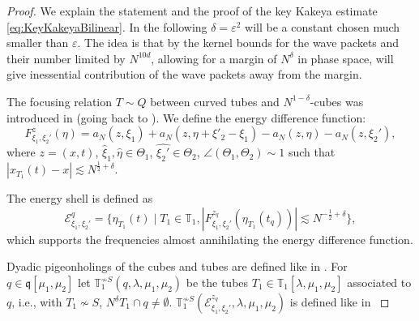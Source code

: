 \documentclass{amsart}
\numberwithin{equation}{section}
\theoremstyle{definition}
\begin{document}
\begin{proof}
We explain the statement and the proof of the key Kakeya estimate \eqref{eq:KeyKakeyaBilinear}. In the following $\delta=\varepsilon^2$ will be a constant chosen much smaller than $\varepsilon$. The idea is that by the kernel bounds for the wave packets and their number limited by $N^{10d}$, allowing for a margin of $N^{\delta}$ in phase space, will give inessential contribution of the wave packets away from the margin.

The focusing relation $T \sim Q$ between curved tubes and $N^{1-\delta}$-cubes was introduced in \cite{SchippaTataru2025} (going back to \cite{Wolff2001,Tao2003}). We define the energy difference function:
\begin{equation*}
F^z_{\xi_1,\xi_2'}(\eta) = a_N(z,\xi_1) + a_N(z,\eta + \xi'_2 - \xi_1) - a_N(z,\eta) - a_N(z,\xi_2'),
\end{equation*}
where $z=(x,t)$, $\hat{\xi}_1,\hat{\eta} \in \Theta_1$, $ \hat{\xi_2'} \in \Theta_2$, $\angle(\Theta_1,\Theta_2) \sim 1$ such that $|x_{T_1}(t) - x| \lesssim N^{\frac{1}{2}+\delta}$.

The energy shell is defined as
\begin{equation*}
\mathcal{E}^q_{\xi_1,\xi_2'} = \{ \eta_{T_1}(t) \mid T_1 \in \mathbb{T}_1, |F^{z_q}_{\xi_1,\xi_2'}(\eta_{T_1}(t_q))| \lesssim N^{-\frac{1}{2}+\delta} \},
\end{equation*}
which supports the frequencies almost annihilating the energy difference function.

Dyadic pigeonholings of the cubes and tubes are defined like in \cite{SchippaTataru2025}.
For $q \in \mathfrak{q}[\mu_1,\mu_2]$ let $\mathbb{T}_1^{\not\sim S}(q,\lambda,\mu_1,\mu_2)$ be the tubes $T_1 \in \mathbb{T}_1[\lambda,\mu_1,\mu_2]$ associated to $q$, i.e., with $T_1 \not\sim S$, $N^{\delta} T_1 \cap q \neq \emptyset$. $\mathbb{T}_1^{\not\sim S}(\mathcal{E}^{z_q}_{\xi_1,\xi_2'},\lambda,\mu_1,\mu_2)$ is defined like in \cite{SchippaTataru2025}


\end{proof}
\end{document}
